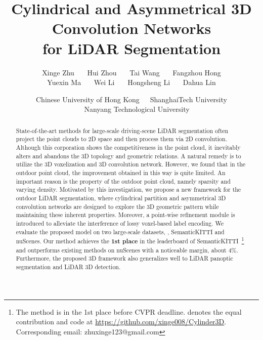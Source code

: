 \documentclass[final]{cvpr}
\begin{document}
\title{Cylindrical and Asymmetrical 3D Convolution Networks\\ for LiDAR Segmentation}

\author{Xinge Zhu~~~ Hui Zhou~~~ Tai Wang~~~ Fangzhou Hong\\ Yuexin Ma~~~ Wei Li~~~ Hongsheng Li~~~ Dahua Lin \and {\small Chinese University of Hong Kong~~~ShanghaiTech University} \\ {\smallInceptio~~~Nanyang Technological University}}

\maketitle





\begin{abstract}
    
State-of-the-art methods for large-scale driving-scene LiDAR  segmentation often project the point clouds to 2D space and then process them via 2D convolution. 
Although this corporation shows the competitiveness in the point cloud, it inevitably alters and abandons the 3D topology and geometric relations. A natural remedy is to utilize the 3D voxelization and 3D convolution network.
However, we found that in the outdoor point cloud, the improvement obtained in this way is quite limited. An important reason is the property of the outdoor point cloud, namely sparsity and varying density.
Motivated by this investigation, we propose a new framework for the outdoor LiDAR segmentation, where cylindrical partition and asymmetrical 3D convolution networks are designed to explore the 3D geometric pattern while maintaining these inherent properties. 
Moreover, a point-wise refinement module is introduced to alleviate the interference of lossy voxel-based label encoding.
We evaluate the proposed model on two large-scale datasets, \ie, SemanticKITTI and nuScenes. Our method achieves the \textbf{1st place} in the leaderboard of SemanticKITTI~\footnote{The method is in the 1st place before CVPR deadline.  denotes the equal contribution and code at \url{https://github.com/xinge008/Cylinder3D}. Corresponding email: zhuxinge123@gmail.com} and outperforms existing methods on nuScenes with a noticeable margin, about 4\%. Furthermore, the proposed 3D framework also generalizes well to LiDAR panoptic segmentation and LiDAR 3D detection.


\end{abstract} 
\end{document}
